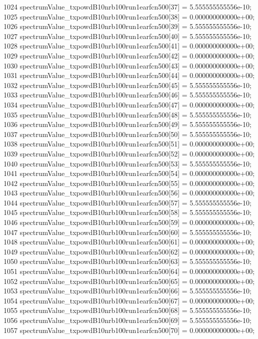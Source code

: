 \begin{DoxyCode}
1024   spectrumValue\_txpowdB10nrb100run1earfcn500[37] = 5.555555555556e-10;
1025   spectrumValue\_txpowdB10nrb100run1earfcn500[38] = 0.000000000000e+00;
1026   spectrumValue\_txpowdB10nrb100run1earfcn500[39] = 5.555555555556e-10;
1027   spectrumValue\_txpowdB10nrb100run1earfcn500[40] = 5.555555555556e-10;
1028   spectrumValue\_txpowdB10nrb100run1earfcn500[41] = 0.000000000000e+00;
1029   spectrumValue\_txpowdB10nrb100run1earfcn500[42] = 0.000000000000e+00;
1030   spectrumValue\_txpowdB10nrb100run1earfcn500[43] = 0.000000000000e+00;
1031   spectrumValue\_txpowdB10nrb100run1earfcn500[44] = 0.000000000000e+00;
1032   spectrumValue\_txpowdB10nrb100run1earfcn500[45] = 5.555555555556e-10;
1033   spectrumValue\_txpowdB10nrb100run1earfcn500[46] = 5.555555555556e-10;
1034   spectrumValue\_txpowdB10nrb100run1earfcn500[47] = 0.000000000000e+00;
1035   spectrumValue\_txpowdB10nrb100run1earfcn500[48] = 5.555555555556e-10;
1036   spectrumValue\_txpowdB10nrb100run1earfcn500[49] = 5.555555555556e-10;
1037   spectrumValue\_txpowdB10nrb100run1earfcn500[50] = 5.555555555556e-10;
1038   spectrumValue\_txpowdB10nrb100run1earfcn500[51] = 0.000000000000e+00;
1039   spectrumValue\_txpowdB10nrb100run1earfcn500[52] = 0.000000000000e+00;
1040   spectrumValue\_txpowdB10nrb100run1earfcn500[53] = 5.555555555556e-10;
1041   spectrumValue\_txpowdB10nrb100run1earfcn500[54] = 0.000000000000e+00;
1042   spectrumValue\_txpowdB10nrb100run1earfcn500[55] = 0.000000000000e+00;
1043   spectrumValue\_txpowdB10nrb100run1earfcn500[56] = 0.000000000000e+00;
1044   spectrumValue\_txpowdB10nrb100run1earfcn500[57] = 5.555555555556e-10;
1045   spectrumValue\_txpowdB10nrb100run1earfcn500[58] = 5.555555555556e-10;
1046   spectrumValue\_txpowdB10nrb100run1earfcn500[59] = 0.000000000000e+00;
1047   spectrumValue\_txpowdB10nrb100run1earfcn500[60] = 5.555555555556e-10;
1048   spectrumValue\_txpowdB10nrb100run1earfcn500[61] = 0.000000000000e+00;
1049   spectrumValue\_txpowdB10nrb100run1earfcn500[62] = 0.000000000000e+00;
1050   spectrumValue\_txpowdB10nrb100run1earfcn500[63] = 5.555555555556e-10;
1051   spectrumValue\_txpowdB10nrb100run1earfcn500[64] = 0.000000000000e+00;
1052   spectrumValue\_txpowdB10nrb100run1earfcn500[65] = 0.000000000000e+00;
1053   spectrumValue\_txpowdB10nrb100run1earfcn500[66] = 5.555555555556e-10;
1054   spectrumValue\_txpowdB10nrb100run1earfcn500[67] = 0.000000000000e+00;
1055   spectrumValue\_txpowdB10nrb100run1earfcn500[68] = 5.555555555556e-10;
1056   spectrumValue\_txpowdB10nrb100run1earfcn500[69] = 5.555555555556e-10;
1057   spectrumValue\_txpowdB10nrb100run1earfcn500[70] = 0.000000000000e+00;

\end{DoxyCode}
